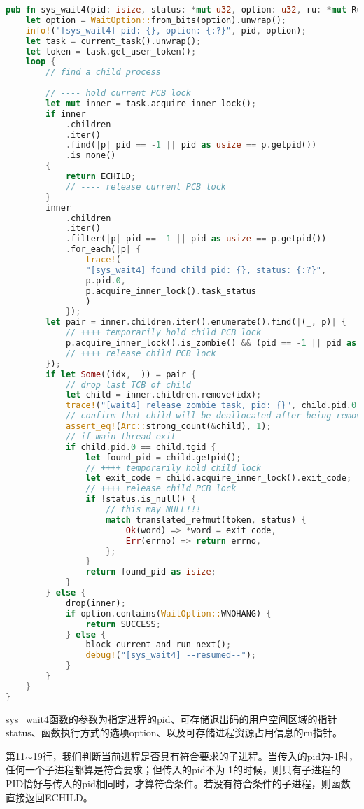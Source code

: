 \begin{lstlisting}[language={Rust}, label={code:wait4},
	caption={os/src/syscall/process.rs}]
pub fn sys_wait4(pid: isize, status: *mut u32, option: u32, ru: *mut Rusage) -> isize {
	let option = WaitOption::from_bits(option).unwrap();
	info!("[sys_wait4] pid: {}, option: {:?}", pid, option);
	let task = current_task().unwrap();
	let token = task.get_user_token();
	loop {
		// find a child process
		
		// ---- hold current PCB lock
		let mut inner = task.acquire_inner_lock();
		if inner
			.children
			.iter()
			.find(|p| pid == -1 || pid as usize == p.getpid())
			.is_none()
		{
			return ECHILD;
			// ---- release current PCB lock
		}
		inner
			.children
			.iter()
			.filter(|p| pid == -1 || pid as usize == p.getpid())
			.for_each(|p| {
				trace!(
				"[sys_wait4] found child pid: {}, status: {:?}",
				p.pid.0,
				p.acquire_inner_lock().task_status
				)
			});
		let pair = inner.children.iter().enumerate().find(|(_, p)| {
			// ++++ temporarily hold child PCB lock
			p.acquire_inner_lock().is_zombie() && (pid == -1 || pid as usize == p.getpid())
			// ++++ release child PCB lock
		});
		if let Some((idx, _)) = pair {
			// drop last TCB of child
			let child = inner.children.remove(idx);
			trace!("[wait4] release zombie task, pid: {}", child.pid.0);
			// confirm that child will be deallocated after being removed from children list
			assert_eq!(Arc::strong_count(&child), 1);
			// if main thread exit
			if child.pid.0 == child.tgid {
				let found_pid = child.getpid();
				// ++++ temporarily hold child lock
				let exit_code = child.acquire_inner_lock().exit_code;
				// ++++ release child PCB lock
				if !status.is_null() {
					// this may NULL!!!
					match translated_refmut(token, status) {
						Ok(word) => *word = exit_code,
						Err(errno) => return errno,
					};
				}
				return found_pid as isize;
			}
		} else {
			drop(inner);
			if option.contains(WaitOption::WNOHANG) {
				return SUCCESS;
			} else {
				block_current_and_run_next();
				debug!("[sys_wait4] --resumed--");
			}
		}
	}
}
\end{lstlisting}

sys\_wait4函数的参数为指定进程的pid、可存储退出码的用户空间区域的指针status、函数执行方式的选项option、以及可存储进程资源占用信息的ru指针。

第11$\sim$19行，我们判断当前进程是否具有符合要求的子进程。当传入的pid为-1时，任何一个子进程都算是符合要求；但传入的pid不为-1的时候，则只有子进程的PID恰好与传入的pid相同时，才算符合条件。若没有符合条件的子进程，则函数直接返回ECHILD。

